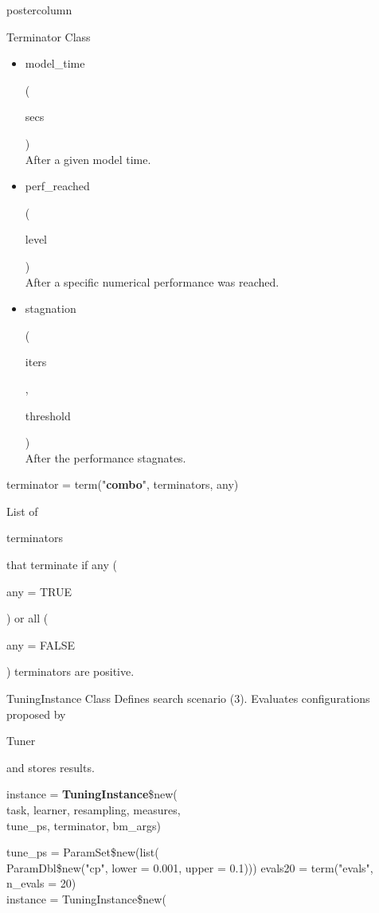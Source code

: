 \documentclass{beamer}
\newcommand{\codeinline}[1]{\begin{codeboxinline}#1\end{codeboxinline}}
\begin{document}
\begin{frame}[fragile]{}
\begin{columns}
\begin{column}{.245\textwidth}
\begin{beamercolorbox}[center]{postercolumn}
\begin{minipage}{.98\textwidth}
{\begin{myblock}{Terminator Class}
\begin{itemize}
								(\codeinline{secs}, \codeinline{stop\_time})\\
								After a given absolute time.
								\item \codeinline{model\_time}
								(\codeinline{secs })\\
								After a given model time.
								\item \codeinline{perf\_reached}
								(\codeinline{level})\\
								After a specific numerical performance was reached.
								\item \codeinline{stagnation}
								(\codeinline{iters}, \codeinline{threshold})\\
								After the performance stagnates.
							\end{itemize}
							\vspace{1em}
							\begin{codebox}
								terminator = term("\textbf{combo}", terminators, any)
							\end{codebox}
							List of \codeinline{terminators} that terminate 
							if any (\codeinline{any = TRUE}) 
							or all (\codeinline{any = FALSE}) terminators are positive.
						\end{myblock}
						\begin{myblock}{TuningInstance Class}
							Defines search scenario (3). 
							Evaluates configurations proposed by \codeinline{Tuner} and stores results.
							\\
							\begin{codeboxmultiline}[width=23.7cm]
								instance = \textbf{TuningInstance}\$new(\\
								\hspace*{1ex}task, learner, resampling, measures,\\
								\hspace*{1ex}tune\_ps, terminator, bm\_args)
							\end{codeboxmultiline}
							\vspace{1em}
							\begin{codeboxexample}
								{\footnotesize
									tune\_ps = ParamSet\$new(list(\\
									\hspace*{1ex} ParamDbl\$new("cp", lower = 0.001, upper = 0.1)))
									evals20 = term("evals", n\_evals = 20)
									\vspace{1em}
									\\
									instance = TuningInstance\$new(\\
}
\end{codeboxexample}
\end{myblock}}
\end{minipage}
\end{beamercolorbox}
\end{column}
\end{columns}
\end{frame}
\end{document}
